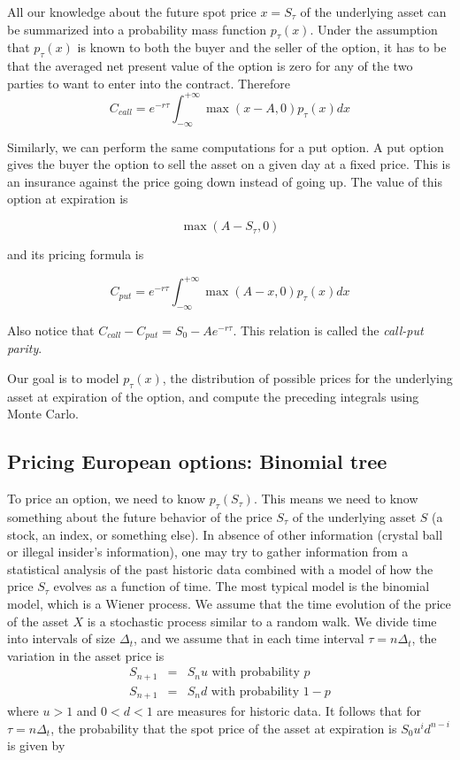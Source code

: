 \documentclass[justified, sixbynine]{tufte-book}
\theoremstyle{plain}%
\newtheorem * {corollary}{Corollary}
\theoremstyle{definition}
\theoremstyle{remark}
\newtheorem * {remark}{Remark}
\newtheorem * {note}{Note}
\begin{document}
\begin{fullwidth}
All our knowledge about the future spot price $x=S_\tau $ of the underlying
asset can be summarized into a probability mass function $p_\tau (x)$. Under
the assumption that $p_\tau (x)$ is known to both the buyer and the seller
of the option, it has to be that the averaged net present value of the
option is zero for any of the two parties to want to enter into the contract.
Therefore
\begin{equation}
C_{call}=e^{-r\tau }\int_{-\infty }^{+\infty }\max (x-A, 0)p_\tau (x)dx
\label{call_option}
\end{equation}

Similarly, we can perform the same computations for a put option. A put option gives the buyer the option to sell the asset on a given day at a fixed price. This is an insurance against the price going down instead of going up. The value of this option at expiration is

\begin{equation}
\max (A-S_\tau, 0)
\end{equation}

and its pricing formula is

\begin{equation}
C_{put}=e^{-r\tau }\int_{-\infty }^{+\infty }\max (A-x, 0)p_\tau (x)dx
\label{put_option}
\end{equation}

Also notice that $C_{call}-C_{put} = S_0 - A e^{-r\tau }$.
This relation is called the {\it call-put parity}.

Our goal is to model $p_\tau(x)$, the distribution of possible prices for the underlying asset at expiration of the option, and compute the preceding integrals using Monte Carlo.

\goodbreak\subsection{Pricing European options: Binomial tree}

To price an option, we need to know $p_\tau (S_\tau )$. This means we need to
know something about the future behavior of the price $S_\tau $ of the
underlying asset $S$ (a stock, an index, or something else). In absence of
other information (crystal ball or illegal insider's information), one may
try to gather information from a statistical analysis of the past historic
data combined with a model of how the price $S_\tau $ evolves as a function of
time. The most typical model is the binomial model, which is a Wiener
process. We assume that the time evolution of the price of the asset $X$ is a
stochastic process similar to a random walk. We divide time into
intervals of size $\Delta _t$, and we assume that in each time interval $\tau
=n\Delta _t$, the variation in the asset price is
\begin{eqnarray}
S_{n+1} &=&S_nu\text{ with probability }p \\
S_{n+1} &=&S_nd\text{ with probability }1-p
\end{eqnarray}
where $u>1$ and $0<d<1$ are measures for historic data. It follows that for $%
\tau =n\Delta _t$, the probability that the spot price of the asset at
expiration is $S_0u^id^{n-i}$ is given by


\end{fullwidth}
\end{document}
